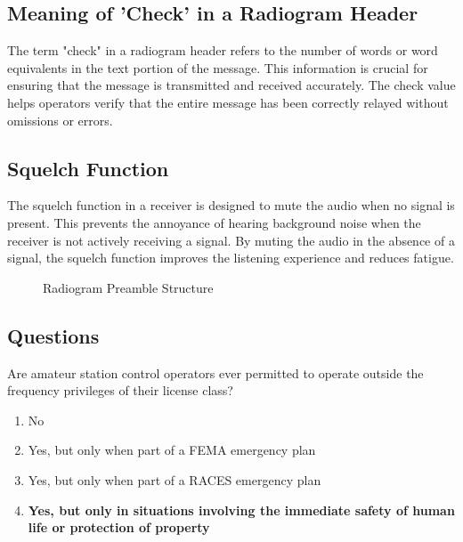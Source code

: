 \subsection*{Meaning of 'Check' in a Radiogram Header}

The term "check" in a radiogram header refers to the number of words or word equivalents in the text portion of the message. This information is crucial for ensuring that the message is transmitted and received accurately. The check value helps operators verify that the entire message has been correctly relayed without omissions or errors.

\subsection*{Squelch Function}

The squelch function in a receiver is designed to mute the audio when no signal is present. This prevents the annoyance of hearing background noise when the receiver is not actively receiving a signal. By muting the audio in the absence of a signal, the squelch function improves the listening experience and reduces fatigue.

\begin{figure}[h]
    \centering
    \caption{Radiogram Preamble Structure}
    \label{fig:radiogram_preamble}
\end{figure}

\subsection*{Questions}

\begin{tcolorbox}[colback=gray!10!white,colframe=black!75!black,title={T2C09}]
    Are amateur station control operators ever permitted to operate outside the frequency privileges of their license class?
    \begin{enumerate}[label=\Alph*),noitemsep]
        \item No
        \item Yes, but only when part of a FEMA emergency plan
        \item Yes, but only when part of a RACES emergency plan
        \item \textbf{Yes, but only in situations involving the immediate safety of human life or protection of property}
    \end{enumerate}
\end{tcolorbox}

